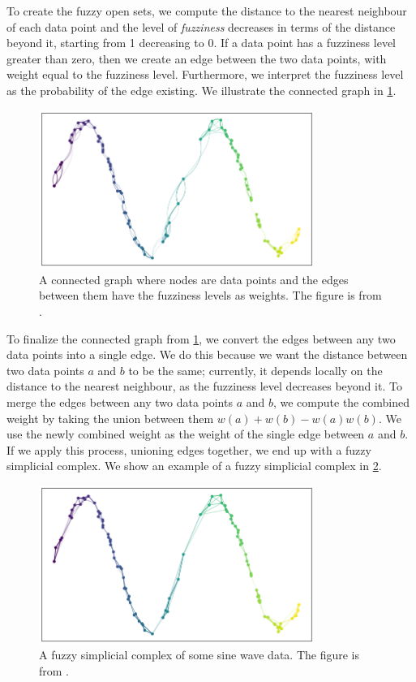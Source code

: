 To create the fuzzy open sets, we compute the distance to the nearest neighbour of each data point and the level of \textit{fuzziness} decreases in terms of the distance beyond it, starting from 1 decreasing to 0. If a data point has a fuzziness level greater than zero, then we create an edge between the two data points, with weight equal to the fuzziness level. Furthermore, we interpret the fuzziness level as the probability of the edge existing. We illustrate the connected graph in \cref{fig:how_umap_works_raw_graph}.

\begin{figure}[H]
    \centering
    \includegraphics[width=0.8\textwidth]{thesis/figures/how_umap_works_raw_graph.png}
    \caption{A connected graph where nodes are data points and the edges between them have the fuzziness levels as weights. The figure is from \cite{how-umap-works-2018}.}
    \label{fig:how_umap_works_raw_graph}
\end{figure}
To finalize the connected graph from \cref{fig:how_umap_works_raw_graph}, we convert the edges between any two data points into a single edge. We do this because we want the distance between two data points $a$ and $b$ to be the same; currently, it depends locally on the distance to the nearest neighbour, as the fuzziness level decreases beyond it. To merge the edges between any two data points $a$ and $b$, we compute the combined weight by taking the union between them $w(a) + w(b) - w(a)w(b)$. We use the newly combined weight as the weight of the single edge between $a$ and $b$. If we apply this process, unioning edges together, we end up with a fuzzy simplicial complex. We show an example of a fuzzy simplicial complex in \cref{fig:how_umap_works_umap_graph}.
\begin{figure}[H]
    \centering
    \includegraphics[width=0.8\textwidth]{thesis/figures/how_umap_works_umap_graph.png}
    \caption{A fuzzy simplicial complex of some sine wave data. The figure is from \cite{how-umap-works-2018}.}
    \label{fig:how_umap_works_umap_graph}
\end{figure}

